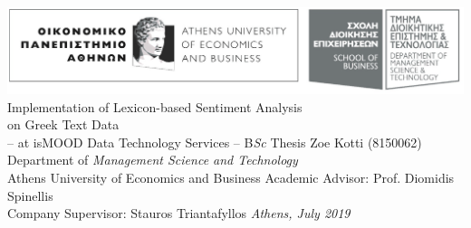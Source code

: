\documentclass[dvips, letterpaper, 12pt]{report}
\begin{document}
\sloppy


\thesistitle
    {\includegraphics[width=\textwidth]{aueb_logo.eps}}
	{Implementation of Lexicon-based Sentiment Analysis \\
	\vspace{3mm}
	 on Greek Text Data \\
	\vspace{1cm}
	 -- at isMOOD Data Technology Services --}
    {B\emph{Sc} Thesis}
	{Zoe Kotti}
	{(8150062)}
	{Department of \emph{Management Science and Technology} \\
     Athens University of Economics and Business}
	{Academic Advisor: Prof. Diomidis Spinellis \\
     Company Supervisor: Stauros Triantafyllos}
    {\emph{Athens, July 2019}}




\tableofcontents


















\appendix

\end{document}
